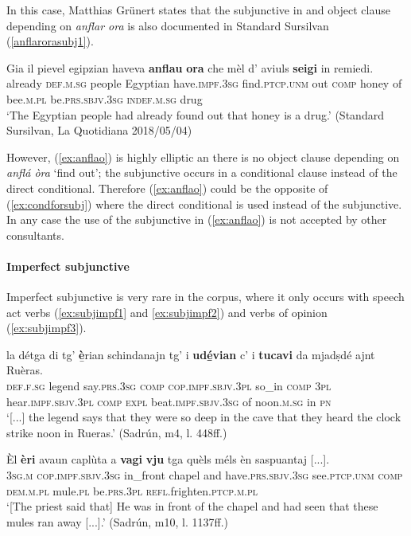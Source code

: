 In this case, Matthias Grünert states that the subjunctive in and object clause depending on \textit{anflar ora} is also documented in Standard Sursilvan (\ref{anflarorasubj1}).

\ea
\label{anflarorasubj1}
\gll Gia il pievel egipzian haveva \textbf{anflau} \textbf{ora} che mèl d’ aviuls \textbf{seigi} in remiedi.\\
already \textsc{def.m.sg} people Egyptian have.\textsc{impf.3sg} find.\textsc{ptcp.unm} out \textsc{comp} honey of bee.\textsc{m.pl} be.\textsc{prs.sbjv.3sg} \textsc{indef.m.sg} drug\\
\glt `The Egyptian people had already found out that honey is a drug.' (Standard Sursilvan, La Quotidiana 2018/05/04)
\z


However, (\ref{ex:anflao}) is highly elliptic an there is no object clause depending on \textit{ anflá òra} `find out'; the subjunctive occurs in a conditional clause instead of the direct conditional. Therefore (\ref{ex:anflao}) could be the opposite of (\ref{ex:condforsubj}) where the direct conditional is used instead of the subjunctive. In any case the use of the subjunctive in (\ref{ex:anflao}) is not accepted by other consultants.

\paragraph{Imperfect subjunctive}
Imperfect subjunctive is very rare in the corpus, where it only occurs with speech act verbs (\ref{ex:subjimpf1} and \ref{ex:subjimpf2}) and verbs of opinion (\ref{ex:subjimpf3}).

\ea
\label{ex:subjimpf1}
\gll [...] la détga di tg’ {\textbf è̱rian} schindanajn tg' i \textbf{udé̱vian} c’ i \textbf{tucavi} da mjadṣdé ajnt Ruèras.\\
{} \textsc{def.f.sg} legend say.\textsc{prs.3sg}  \textsc{comp} \textsc{cop.impf.sbjv.3pl} so\_in \textsc{comp} \textsc{3pl} hear.\textsc{impf.sbjv.3pl} \textsc{comp} \textsc{expl} beat.\textsc{impf.sbjv.3sg} of noon.\textsc{m.sg} in \textsc{pn}\\
\glt `[...] the legend says that they were so deep in the cave that they heard the clock strike noon in Rueras.' (Sadrún, m4, l. 448ff.)
\z

\ea
\label{ex:subjimpf2}
\gll  Èl \textbf{èri} avaun caplùta a \textbf{vagi} \textbf{vju} tga quèls méls èn saspuantaj [...].  \\
\textsc{3sg.m} \textsc{cop.impf.sbjv.3sg} in\_front chapel and have.\textsc{prs.sbjv.3sg} see.\textsc{ptcp.unm} \textsc{comp} \textsc{dem.m.pl} mule.\textsc{pl} be.\textsc{prs.3pl} \textsc{refl.}frighten.\textsc{ptcp.m.pl}\\
\glt `[The priest said that] He was in front of the chapel and had seen that these mules ran away [...].' (Sadrún, m10, l. 1137ff.)
\z

